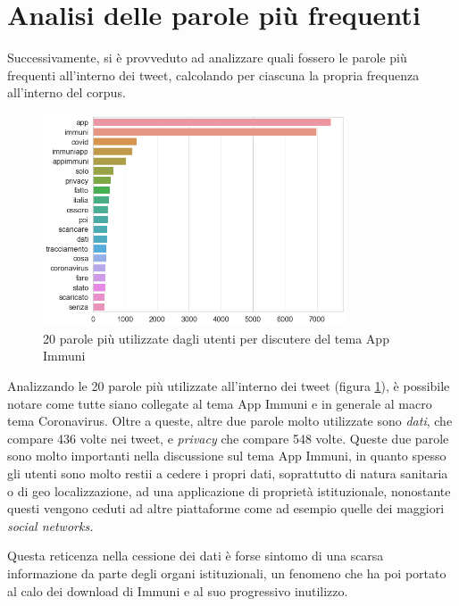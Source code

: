 \section{Analisi delle parole più frequenti}
Successivamente, si è provveduto ad analizzare quali fossero le parole più frequenti all'interno dei tweet, calcolando per ciascuna la propria frequenza all'interno del corpus.
\begin{figure} [H]
    \centering
    \includegraphics[width = 0.8\textwidth]{img/freq_toj.jpg}
    \caption{20 parole più utilizzate dagli utenti per discutere del tema App Immuni}
    \label{fig:most_common_20_tok}
\end{figure}
Analizzando le 20 parole più utilizzate all'interno dei tweet (figura \ref{fig:most_common_20_tok}), è possibile notare come tutte siano collegate al tema App Immuni e in generale al macro tema Coronavirus. Oltre a queste, altre due parole molto utilizzate sono \textit{dati}, che compare 436 volte nei tweet, e \textit{privacy} che compare 548 volte. Queste due parole sono molto importanti nella discussione sul tema App Immuni, in quanto spesso gli utenti sono molto restii a cedere i propri dati, soprattutto di natura sanitaria o di geo localizzazione, ad una applicazione di proprietà istituzionale, nonostante questi vengono ceduti ad altre piattaforme come ad esempio quelle dei maggiori \textit{social networks.}


Questa reticenza nella cessione dei dati è forse sintomo di una scarsa informazione da parte degli organi istituzionali, un fenomeno che ha poi portato al calo dei download di Immuni e al suo progressivo inutilizzo.


